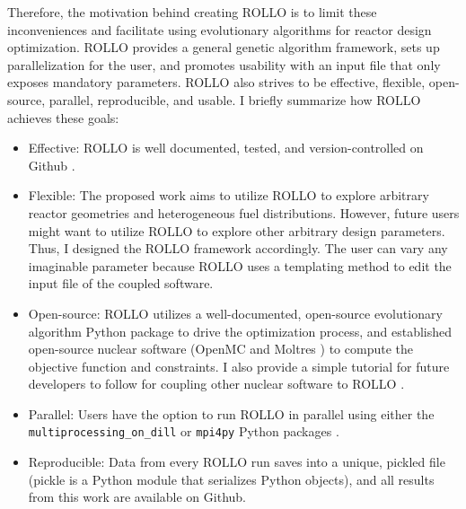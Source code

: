Therefore, the motivation behind creating \gls{ROLLO} is to limit these inconveniences and 
facilitate using evolutionary algorithms for reactor design optimization.
\gls{ROLLO} provides a general genetic algorithm framework, sets up 
parallelization for the user, and promotes usability with an input file 
that only exposes mandatory parameters.
\gls{ROLLO} also strives to be effective, flexible, open-source, parallel, reproducible, 
and usable. 
I briefly summarize how \gls{ROLLO} achieves these goals:  
\begin{itemize}
    \item Effective: \gls{ROLLO} is well documented, tested, and 
    version-controlled on Github \cite{chee_rollo_2021}.
    \item Flexible: The proposed work aims to utilize \gls{ROLLO} to 
    explore arbitrary reactor geometries and heterogeneous fuel distributions. 
    However, future users might want to utilize \gls{ROLLO} 
    to explore other arbitrary design parameters. Thus, I designed the \gls{ROLLO}
    framework accordingly. The user can vary any imaginable parameter 
    because \gls{ROLLO} uses a templating method to edit the input file of the 
    coupled software.
    \item Open-source: \gls{ROLLO} utilizes a well-documented, open-source 
    evolutionary algorithm Python package to drive the optimization process, 
    and established open-source nuclear software (OpenMC \cite{romano_openmc_2013} and 
    Moltres \cite{lindsay_introduction_2018}) to compute the objective function 
    and constraints. I also provide a simple tutorial for future developers to 
    follow for coupling other nuclear software to \gls{ROLLO} \cite{chee_documentation_2021}.  
    \item Parallel: Users have the option to run \gls{ROLLO} in parallel using 
    either the \\ \texttt{multiprocessing\_on\_dill} or \texttt{mpi4py} Python 
    packages \cite{dalcin_mpi_2008}.
    \item Reproducible: Data from every \gls{ROLLO} run saves into a unique, pickled 
    file (pickle is a Python module that serializes Python objects), and all 
    results from this work are available on Github. 
\end{itemize}

